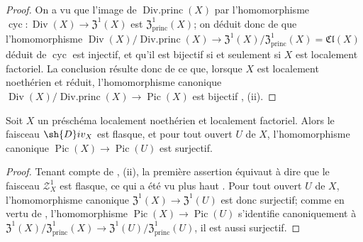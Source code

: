\begin{proof}
On a vu  que l'image de $\operatorname{Div.princ}(X)$ par l'homomorphisme $\operatorname{cyc}:\operatorname{Div}(X)\to\mathfrak{Z}^1(X)$ est $\mathfrak{Z}^1_\mathrm{princ}(X)$;
on déduit donc de  que l'homomorphisme $\operatorname{Div}(X)/\operatorname{Div.princ}(X)\to\mathfrak{Z}^1(X)/\mathfrak{Z}^1_\mathrm{princ}(X)=\mathfrak{Cl}(X)$ déduit de $\operatorname{cyc}$ est injectif, et qu'il est bijectif si et seulement si $X$ est localement factoriel.
La conclusion résulte donc de ce que, lorsque $X$ est localement noethérien et réduit, l'homomorphisme canonique $\operatorname{Div}(X)/\operatorname{Div.princ}(X)\to\operatorname{Pic}(X)$  est bijectif , (ii).
\end{proof}

\begin{corollary}[21.6.11]
\label{IV.21.6.11}
Soit $X$ un préschéma localement noethérien et localement factoriel.
Alors le faisceau $\sh{D}iv_X$ est flasque, et pour tout ouvert $U$ de $X$, l'homomorphisme canonique $\operatorname{Pic}(X)\to\operatorname{Pic}(U)$ est surjectif.
\end{corollary}

\begin{proof}
Tenant compte de , (ii), la première assertion équivaut à dire que le faisceau $\mathscr{Z}_X^1$ est flasque, ce qui a été vu plus haut .
Pour tout ouvert $U$ de $X$, l'homomorphisme canonique $\mathfrak{Z}^1(X)\to\mathfrak{Z}^1(U)$ est donc surjectif;
comme en vertu de , l'homomorphisme $\operatorname{Pic}(X)\to\operatorname{Pic}(U)$ s'identifie canoniquement à $\mathfrak{Z}^1(X)/\mathfrak{Z}^1_\mathrm{princ}(X)\to\mathfrak{Z}^1(U)/\mathfrak{Z}^1_\mathrm{princ}(U)$, il est aussi surjectif.
\end{proof}

